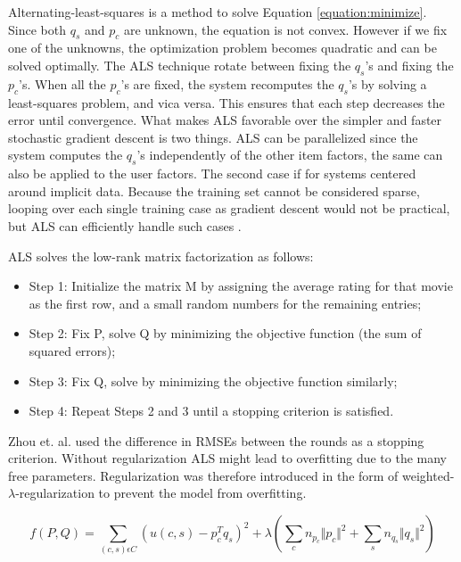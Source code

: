 Alternating-least-squares is a method to solve Equation \ref{equation:minimize}. Since both $q_{s}$ and $p_{c}$
are unknown, the equation is not convex. However if we fix one of the unknowns, the optimization problem becomes
quadratic and can be solved optimally. The ALS technique rotate between fixing the $q_{s}$'s and fixing the $p_{c}$'s.
When all the $p_{c}$'s are fixed, the system recomputes the $q_{s}$'s by solving a least-squares problem, and vica versa.
This ensures that each step decreases the error until convergence. What makes ALS favorable over the simpler and faster
stochastic gradient descent is two things. ALS can be parallelized since the system computes the $q_{s}$'s independently
of the other item factors, the same can also be applied to the user factors. The second case if for systems centered around
implicit data. Because the training set cannot be considered sparse, looping over each single training case as gradient descent
would not be practical, but ALS can efficiently handle such cases \cite{Hu2008}.\newline

ALS solves the low-rank matrix factorization as follows:

\begin{itemize}
\item Step 1: Initialize the matrix M by assigning the average rating for that movie as the first row, and a small random numbers for the remaining entries;
\item Step 2: Fix P, solve Q by minimizing the objective function (the sum of squared errors);
\item Step 3: Fix Q, solve by minimizing the objective function similarly;
\item Step 4: Repeat Steps 2 and 3 until a stopping criterion is satisfied.
\end{itemize}

Zhou et. al. \cite{Zhou2008} used the difference in RMSEs between the rounds as a stopping criterion.
Without regularization ALS might lead to overfitting due to the many free parameters. Regularization was
therefore introduced in the form of weighted-$\lambda$-regularization to prevent the model from overfitting.

\begin{equation}
f(P, Q) = \sum_{(c,s)\epsilon C} (u(c,s) - p^{T}_{c}q_{s})^{2} + \lambda (\sum_{c} n_{p_{c}} \Vert p_{c} \Vert ^{2} + \sum_{s} n_{q_{s}} \Vert q_{s} \Vert ^{2})
\label{WeightedLamba}
\end{equation}

